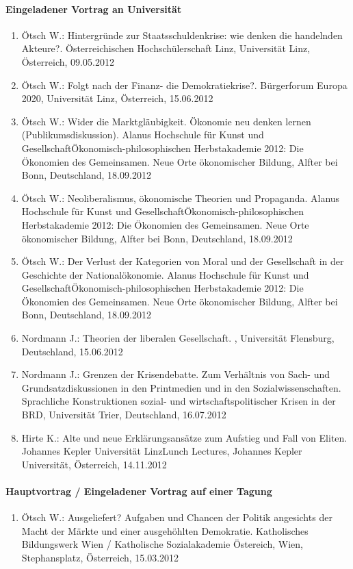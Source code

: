 \paragraph{Eingeladener Vortrag an Universität}
\begin{enumerate}
	\item Ötsch W.: Hintergründe zur Staatsschuldenkrise: wie denken die handelnden Akteure?. Österreichischen Hochschülerschaft Linz, Universität Linz, Österreich, 09.05.2012
	\item Ötsch W.: Folgt nach der Finanz- die Demokratiekrise?. Bürgerforum Europa 2020, Universität Linz, Österreich, 15.06.2012
	\item Ötsch W.: Wider die Marktgläubigkeit. Ökonomie neu denken lernen (Publikumsdiskussion). Alanus Hochschule für Kunst und GesellschaftÖkonomisch-philosophischen Herbstakademie 2012: Die Ökonomien des Gemeinsamen. Neue Orte ökonomischer Bildung, Alfter bei Bonn, Deutschland, 18.09.2012
	\item Ötsch W.: Neoliberalismus, ökonomische Theorien und Propaganda. Alanus Hochschule für Kunst und GesellschaftÖkonomisch-philosophischen Herbstakademie 2012: Die Ökonomien des Gemeinsamen. Neue Orte ökonomischer Bildung, Alfter bei Bonn, Deutschland, 18.09.2012
	\item Ötsch W.: Der Verlust der Kategorien von Moral und der Gesellschaft in der Geschichte der Nationalökonomie. Alanus Hochschule für Kunst und GesellschaftÖkonomisch-philosophischen Herbstakademie 2012: Die Ökonomien des Gemeinsamen. Neue Orte ökonomischer Bildung, Alfter bei Bonn, Deutschland, 18.09.2012
	\item Nordmann J.: Theorien der liberalen Gesellschaft. , Universität Flensburg, Deutschland, 15.06.2012
	\item Nordmann J.: Grenzen der Krisendebatte. Zum Verhältnis von Sach- und Grundsatzdiskussionen in den Printmedien und in den Sozialwissenschaften. Sprachliche Konstruktionen sozial- und wirtschaftspolitischer \glqq Krisen\grqq{} in der BRD, Universität Trier, Deutschland, 16.07.2012
	\item Hirte K.: Alte und neue Erklärungsansätze zum Aufstieg und Fall von Eliten. Johannes Kepler Universität LinzLunch Lectures, Johannes Kepler Universität, Österreich, 14.11.2012
\end{enumerate}
\paragraph{Hauptvortrag / Eingeladener Vortrag auf einer Tagung}
\begin{enumerate}
	\item Ötsch W.: Ausgeliefert? Aufgaben und Chancen der Politik angesichts der \glqq Macht der Märkte\grqq{} und einer ausgehöhlten Demokratie. Katholisches Bildungswerk Wien / Katholische Sozialakademie Östereich, Wien, Stephansplatz, Österreich, 15.03.2012
\end{enumerate}
